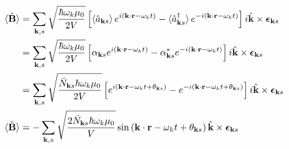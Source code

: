\documentclass[../../../main.tex]{subfiles}
\begin{document}
\begin{align*}
  \braket{  \hat{\mathbf{B}}  }
   & =   \sum_{\mathbf{k},s} \sqrt{\frac{\hbar \omega_k \mu_0}{2  V}} \left[ \braket{\hat{a}_{\mathbf{k}s}  } e^{i(\mathbf{k} \cdot \mathbf{r} - \omega_k t)} - \braket{\hat{a}_{\mathbf{k}s}^{\dagger}} e^{-i(\mathbf{k} \cdot \mathbf{r} - \omega_k t)} \right] i \hat{\mathbf{k}}\times \boldsymbol{\epsilon}_{\mathbf{k}s}                                          \\
   & =   \sum_{\mathbf{k},s} \sqrt{\frac{\hbar \omega_k\mu_0}{2  V}} \left[ \alpha_{\mathbf{k }s} e^{i(\mathbf{k} \cdot \mathbf{r} - \omega_k t)} - \alpha_{\mathbf{k }s}^* e^{-i(\mathbf{k} \cdot \mathbf{r} - \omega_k t)} \right] i \hat{\mathbf{k}}\times \boldsymbol{\epsilon}_{\mathbf{k}s}                                                                       \\
   & =   \sum_{\mathbf{k},s} \sqrt{\frac{\bar{N}_{\mathbf{k}s}\hbar \omega_k \mu_0}{2 V}} \left[  e^{i(\mathbf{k} \cdot \mathbf{r} - \omega_k t+ \theta_{\mathbf{k}s})} - e^{-i(\mathbf{k} \cdot \mathbf{r} - \omega_k t+\theta_{\mathbf{k}s}) } \right] i \hat{\mathbf{k}}                                                  \times \boldsymbol{\epsilon}_{\mathbf{k}s} \\
  \braket{  \hat{\mathbf{B}}  }
   & =  - \sum_{\mathbf{k},s} \sqrt{\frac{2 \bar{N}_{\mathbf{k}s}\hbar \omega_k \mu_0}{V}}  \sin   \left( \mathbf{k} \cdot \mathbf{r} - \omega_k t+\theta_{\mathbf{k}s}  \right) \hat{\mathbf{k}}\times \boldsymbol{\epsilon}_{\mathbf{k}s}
\end{align*}
\end{document}
